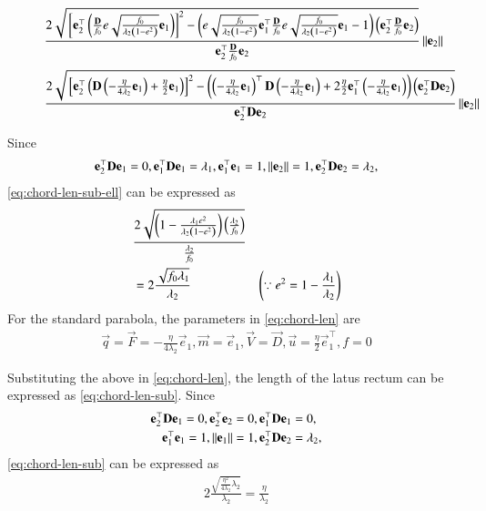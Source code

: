 \begin{enumerate}[label=\thesubsection.\arabic*.,ref=\thesubsection.\theenumi]
\begin{figure*}[!t]
\begin{align}
 \frac{2\sqrt{
{}\left[
\mathbf{e}_2^{\top}\left(\frac{\mathbf{D}}{f_0} e\sqrt{\frac{f_0}{\lambda_2\left(1-e^2\right)}} \mathbf{e }_1\right)
\right]^2
-
\left(
 e\sqrt{\frac{f_0}{\lambda_2\left(1-e^2\right)}} \mathbf{e }_1^{\top}\frac{\mathbf{D}}{f_0} e\sqrt{\frac{f_0}{\lambda_2\left(1-e^2\right)}} \mathbf{e }_1 -1 
\right)
\left(\mathbf{e}_2^{\top}\frac{\mathbf{D}}{f_0}\mathbf{e}_2\right)
}
}
{
\mathbf{e}_2^{\top}\frac{\mathbf{D}}{f_0}\mathbf{e}_2
}\left\lVert\mathbf{e}_2\right\rVert
\label{eq:chord-len-sub-ell}
  \end{align}
\begin{align}
 \frac{2\sqrt{
{}\left[
\mathbf{e}_2^{\top}\left(\mathbf{D}\left(-\frac{\eta}{4\lambda_2}\mathbf{e}_1\right)+\frac{\eta}{2}\mathbf{e}_1\right)
\right]^2
-
\left(
\left(-\frac{\eta}{4\lambda_2}\mathbf{e}_1\right)^{\top}\mathbf{D}\left(-\frac{\eta}{4\lambda_2}\mathbf{e}_1\right) + 2\frac{\eta}{2}\mathbf{e}_1^{\top}\left(-\frac{\eta}{4\lambda_2}\mathbf{e}_1\right) 
\right)
\left(\mathbf{e}_2^{\top}\mathbf{D}\mathbf{e}_2\right)
}
}
{
\mathbf{e}_2^{\top}\mathbf{D}\mathbf{e}_2
}\left\lVert\mathbf{e}_2\right\rVert
\label{eq:chord-len-sub}
  \end{align}
\end{figure*}
  Since 
  \begin{align}
\mathbf{e}_2^{\top}\mathbf{D}\mathbf{e}_1 = 0, 
\mathbf{e}_1^{\top}\mathbf{D}\mathbf{e}_1 = \lambda_1,
\mathbf{e}_1^{\top}\mathbf{e}_1 = 1,
	  \left\lVert\mathbf{e}_2\right\rVert = 1,
\mathbf{e}_2^{\top}\mathbf{D}\mathbf{e}_2 = \lambda_2,
  \end{align}
\eqref{eq:chord-len-sub-ell} can be expressed as 
  \begin{align}
	&		\frac{2\sqrt{\left(1-\frac{\lambda_1e^2}{{\lambda_2\left(1-e^2\right)}}\right)\left(\frac{\lambda_2}{f_0}\right)}}
{
	\frac{\lambda_2}{f_0}
	} 	
	\\
	&=		2\frac{\sqrt{
		f_0\lambda_1}}{\lambda_2}
 & \left( \because e^2 = 1-\frac{\lambda_1}{\lambda_2}\right)
		   \end{align}
For the standard parabola, the parameters in 
\eqref{eq:chord-len} are
\begin{align}  
	\vec{q} =\vec{F} =  -\frac{\eta}{4\lambda_2}\vec{e}_1, \vec{m} = \vec{e}_1, \vec{V} = \vec{D},
	\vec{u} = \frac{\eta}{2}\vec{e}_1^{\top}, f = 0
\end{align}  

Substituting the above in
\eqref{eq:chord-len}, 
the length of the latus rectum  can be expressed as
\eqref{eq:chord-len-sub}.
  Since 
  \begin{align}
\mathbf{e}_2^{\top}\mathbf{D}\mathbf{e}_1 = 0, 
\mathbf{e}_2^{\top}\mathbf{e}_2 = 0,
	  \mathbf{e}_1^{\top}\mathbf{D}\mathbf{e}_1 &= 0,\
	  \\
\mathbf{e}_1^{\top}\mathbf{e}_1 = 1,
	  \left\lVert\mathbf{e}_1\right\rVert = 1,
	  \mathbf{e}_2^{\top}\mathbf{D}\mathbf{e}_2 &= \lambda_2,
  \end{align}
\eqref{eq:chord-len-sub} can be expressed as 
  \begin{align}
	  2 \frac{\sqrt{\frac{\eta^2}{4\lambda_2}\lambda_2}}{\lambda_2}
	  = \frac{\eta}{\lambda_2}
  \end{align}
%

		\end{enumerate}
